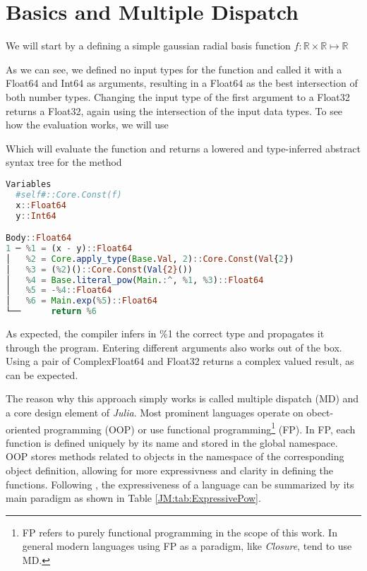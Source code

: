 \section{Basics and Multiple Dispatch}
\label{JM:sec:basics}

We will start by a defining a simple gaussian radial basis function $f : \mathbb{R} \times \mathbb{R} \mapsto \mathbb{R}$ 



As we can see, we defined no input types for the function and called it with a Float64 and Int64 as arguments, resulting in a Float64 as the best intersection of both number types.
Changing the input type of the first argument to a Float32 returns a Float32, again using the intersection of the input data types. To see how the evaluation works, we will use



Which will evaluate the function and returns a lowered and type-inferred abstract syntax tree for the method

\begin{lstlisting}[language=Julia]
    Variables
  #self#::Core.Const(f)
  x::Float64
  y::Int64

Body::Float64
1 ─ %1 = (x - y)::Float64
│   %2 = Core.apply_type(Base.Val, 2)::Core.Const(Val{2})
│   %3 = (%2)()::Core.Const(Val{2}())
│   %4 = Base.literal_pow(Main.:^, %1, %3)::Float64
│   %5 = -%4::Float64
│   %6 = Main.exp(%5)::Float64
└──      return %6
\end{lstlisting}

As expected, the compiler infers in \%1 the correct type and propagates it through the program.
Entering different arguments also works out of the box. Using a pair of ComplexFloat64 and Float32 
returns a complex valued result, as can be expected.



The reason why this approach simply works is called multiple dispatch (MD) and a core design element of \textit{Julia}. Most prominent languages operate on
obect-oriented programming (OOP) or use functional programming\footnote{FP refers to purely functional programming in the scope of this work. In general modern languages using FP as a paradigm, like \textit{Closure}, tend to use MD.} (FP).
In FP, each function is defined uniquely by its name and stored in the global namespace. OOP stores methods related to objects in the namespace
of the corresponding object definition, allowing for more expressivness and clarity in defining the functions. Following \cite{JMKarpinski2019}, the expressiveness of 
a language can be summarized by its main paradigm as shown in Table \ref{JM:tab:ExpressivePow}.


